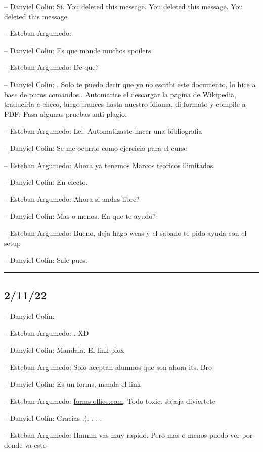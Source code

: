 -- Danyiel Colin: Si. You deleted this message. You deleted this
message. You deleted this message

-- Esteban Argumedo:

-- Danyiel Colin: Es que mande muchos spoilers

-- Esteban Argumedo: De que?

-- Danyiel Colin: . Solo te puedo decir que yo no escribi este
documento, lo hice a base de puros comandos.. Automatice el descargar la
pagina de Wikipedia, traducirla a checo, luego frances hasta nuestro
idioma, di formato y compile a PDF. Pasa algunas pruebas anti plagio.

-- Esteban Argumedo: Lel. Automatizaste hacer una bibliografia

-- Danyiel Colin: Se me ocurrio como ejercicio para el curso

-- Esteban Argumedo: Ahora ya tenemos Marcos teoricos ilimitados.

-- Danyiel Colin: En efecto.

-- Esteban Argumedo: Ahora si andas libre?

-- Danyiel Colin: Mas o menos. En que te ayudo?

-- Esteban Argumedo: Bueno, deja hago weas y el sabado te pido ayuda con
el setup

-- Danyiel Colin: Sale pues.

\begin{center}\rule{0.5\linewidth}{0.5pt}\end{center}

\hypertarget{section-4}{%
\subsection{2/11/22}\label{section-4}}

-- Danyiel Colin:

-- Esteban Argumedo: . XD

-- Danyiel Colin: Mandala. El link plox

-- Esteban Argumedo: Solo aceptan alumnos que son ahora its. Bro

-- Danyiel Colin: Es un forms, manda el link

-- Esteban Argumedo:
\href{https://forms.office.com/r/xk5VDJ6BbA}{forms.office.com}. Todo
toxic. Jajaja diviertete

-- Danyiel Colin: Gracias :). . . .

-- Esteban Argumedo: Hmmm vas muy rapido. Pero mas o menos puedo ver por
donde va esto

